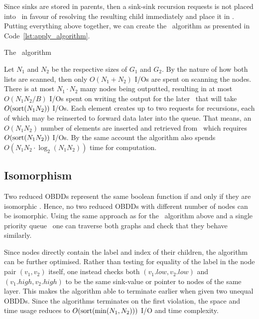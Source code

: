Since sinks are stored in parents, then a sink-sink recursion requests is not
placed into \ApplyQrec\ in favour of resolving the resulting child immediately
and place it in \ReduceQdep. Putting everything above together, we can create
the \Apply\ algorithm as presented in Code~\ref{lst:apply_algorithm}.

\begin{lstfloat}[ht!]
  \centering

  

  \caption{The \Apply\ algorithm}
  \label{lst:apply_algorithm}
\end{lstfloat}

Let $N_1$ and $N_2$ be the respective sizes of $G_1$ and $G_2$. By the nature of
how both lists are scanned, then only $O(N_1 + N_2)$ I/Os are spent on scanning
the nodes. There is at most $N_1 \cdot N_2$ many nodes being outputted,
resulting in at most $O(N_1 N_2 / B)$ I/Os spent on writing the output for the
later \Reduce\ that will take $O(\text{sort}(N_1 N_2))$ I/Os. Each element creates up
to two requests for recursions, each of which may be reinserted to forward data
later into the queue. That means, an $O(N_1 N_2)$ number of elements are
inserted and retrieved from \ApplyQrec\ which requires $O(\text{sort}(N_1 N_2))$ I/Os.
By the same account the algorithm also spends $O(N_1 N_2 \cdot \log_2 (N_1 N_2))$
time for computation. \cite{Arge96}

\clearpage
\subsection{Isomorphism} \label{sec:theory__equal}
Two reduced OBDDs represent the same boolean function if and only if they are
isomorphic \cite[Theorem 1]{Bryant86}. Hence, no two reduced OBDDs with
different number of nodes can be isomorphic. Using the same approach as for the
\Apply\ algorithm above and a single priority queue \IsomorphicQrec\, one can
traverse both graphs and check that they behave similarly.

Since nodes directly contain the label and index of their children, the
algorithm can be further optimised. Rather than testing for equality of the
label in the node pair $(v_1,v_2)$ itself, one instead checks both
$(v_1.\mathit{low}, v_2.\mathit{low})$ and $(v_1.\mathit{high},
v_2.\mathit{high})$ to be the same sink-value or pointer to nodes of the same
layer. This makes the algorithm able to terminate earlier when given two unequal
OBDDs. Since the algorithms terminates on the first violation, the space and
time usage reduces to $O(\text{sort}(\min(N_1, N_2)))$ I/O and time complexity.

